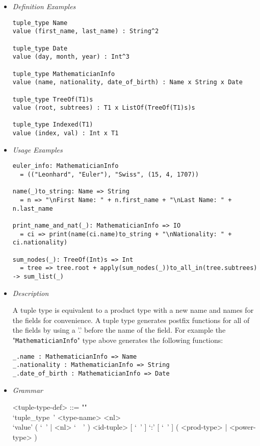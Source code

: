 \documentclass[diploma]{softlab-thesis}
\begin{document}
\begin{itemize}
\item \textit{Definition Examples}

\begin{verbatim}
tuple_type Name
value (first_name, last_name) : String^2

tuple_type Date
value (day, month, year) : Int^3

tuple_type MathematicianInfo
value (name, nationality, date_of_birth) : Name x String x Date

tuple_type TreeOf(T1)s
value (root, subtrees) : T1 x ListOf(TreeOf(T1)s)s

tuple_type Indexed(T1)
value (index, val) : Int x T1
\end{verbatim}

\item \textit{Usage Examples}

\begin{verbatim}
euler_info: MathematicianInfo
  = (("Leonhard", "Euler"), "Swiss", (15, 4, 1707))

name(_)to_string: Name => String
  = n => "\nFirst Name: " + n.first_name + "\nLast Name: " + n.last_name

print_name_and_nat(_): MathematicianInfo => IO
  = ci => print(name(ci.name)to_string + "\nNationality: " + ci.nationality)

sum_nodes(_): TreeOf(Int)s => Int
  = tree => tree.root + apply(sum_nodes(_))to_all_in(tree.subtrees) -> sum_list(_)
\end{verbatim}

\item \textit{Description}

A tuple type is equivalent to a product type with a new name  and names for the
fields for convenience. A tuple type generates postfix functions for all of
the fields by using a '.' before the name of the field. For example the
"\verb|MathematicianInfo|" type above generates the following functions:
\begin{verbatim}
_.name : MathematicianInfo => Name
_.nationality : MathematicianInfo => String
_.date_of_birth : MathematicianInfo => Date
\end{verbatim}

\newpage

\item \textit{Grammar}

\begin{grammar}
<tuple-type-def> ::= ""\\
`tuple_type\ ' <type-name> <nl> \\
`value' ( `\ ' | <nl> `\ \ ' )
<id-tuple> [ `\ ' ] `:' [ `\ ' ] ( <prod-type> | <power-type> )


\end{grammar}
\end{itemize}
\end{document}
